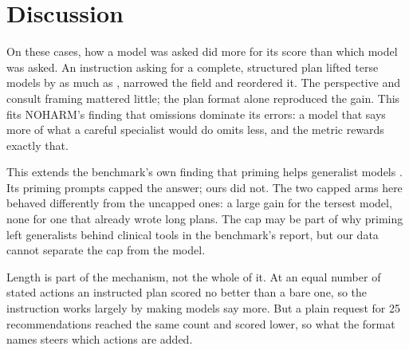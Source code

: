 \documentclass[11pt]{article}
\begin{document}
\FloatBarrier
\section{Discussion}
\label{sec:discussion}
On these cases, how a model was asked did more for its score than which model was asked. An
instruction asking for a complete, structured plan lifted terse models by as much as
\covDPromptGrokThorough{}, narrowed the field and reordered it. The perspective and consult framing
mattered little; the plan format alone reproduced the gain. This fits NOHARM's finding that omissions
dominate its errors: a model that says more of what a careful specialist would do omits less, and the
metric rewards exactly that.

This extends the benchmark's own finding that priming helps generalist models \citep{wu2025noharm}.
Its priming prompts capped the answer; ours did not. The two capped arms here behaved differently from
the uncapped ones: a large gain for the tersest model, none for one that already wrote long plans. The
cap may be part of why priming left generalists behind clinical tools in the benchmark's report, but
our data cannot separate the cap from the model.

Length is part of the mechanism, not the whole of it. At an equal number of stated actions an
instructed plan scored no better than a bare one, so the instruction works largely by making models
say more. But a plain request for 25 recommendations reached the same count and scored lower, so what
the format names steers which actions are added.
\end{document}
